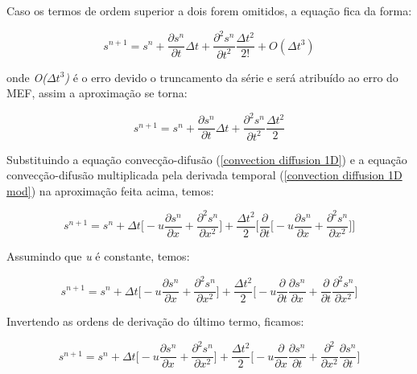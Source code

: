 \medskip
Caso os termos de ordem superior a dois forem omitidos, a equação fica 
da forma:

\begin{equation}
 s^{n+1} = s^{n} 
         + \frac{\partial s^{n}}{\partial t}\Delta t 
         + \frac{\partial^2 s^{n}}{\partial t^2} \frac{\Delta t^2}{2!}
         + O(\Delta t^3)
\end{equation}

onde \textit{O($\Delta t^3$)} é o erro devido o truncamento da série e
será atribuído ao erro do MEF, assim a aproximação se torna:

\begin{equation} \label{taylor serie 1D}
 s^{n+1} = s^{n} 
         + \frac{\partial s^{n}}{\partial t}\Delta t 
         + \frac{\partial^2 s^{n}}{\partial t^2} \frac{\Delta t^2}{2}
\end{equation}

Substituindo a equação convecção-difusão (\ref{convection diffusion 1D})
e a equação convecção-difusão multiplicada pela derivada temporal
(\ref{convection diffusion 1D mod}) na aproximação feita acima, temos:

\begin{equation}
 s^{n+1} = s^{n} 
         + \Delta t 
         \bigg[
         - u \frac{\partial s^{n}}{\partial x}
         + \frac{\partial^2 s^{n}}{\partial x^2} 
         \bigg]
         + \frac{\Delta t^2}{2}
         \bigg[
         \frac{\partial }{\partial t}
         \bigg[ 
         - u \frac{\partial s^{n}}{\partial x}
         + \frac{\partial^2 s^{n}}{\partial x^2} 
         \bigg]
         \bigg]
\end{equation}

Assumindo que \textit{u} é constante, temos:

\begin{equation}
 s^{n+1} = s^{n} 
         + \Delta t 
         \bigg[
         - u \frac{\partial s^{n}}{\partial x}
         + \frac{\partial^2 s^{n}}{\partial x^2} 
         \bigg]
         + \frac{\Delta t^2}{2}
         \bigg[
         - u
         \frac{\partial }{\partial t}
         \frac{\partial s^{n}}{\partial x}
         + \frac{\partial }{\partial t}
         \frac{\partial^2 s^{n}}{\partial x^2} 
         \bigg]
\end{equation}

Invertendo as ordens de derivação do último termo, ficamos:

\begin{equation}
 s^{n+1} = s^{n} 
         + \Delta t 
         \bigg[
         - u \frac{\partial s^{n}}{\partial x}
         + \frac{\partial^2 s^{n}}{\partial x^2} 
         \bigg]
         + \frac{\Delta t^2}{2}
         \bigg[
         - u
         \frac{\partial }{\partial x}
         \frac{\partial s^{n}}{\partial t}
         + \frac{\partial^2 }{\partial x^2}
         \frac{\partial s^{n}}{\partial t} 
         \bigg]
\end{equation}


